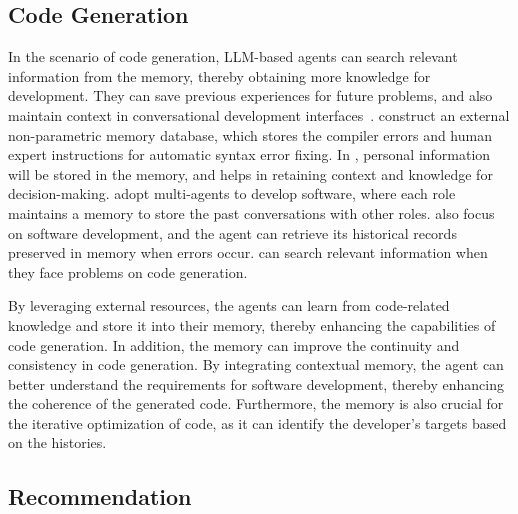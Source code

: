 \documentclass{article}
\theoremstyle{definition}
\theoremstyle{theorem}
\theoremstyle{proof}
\theoremstyle{remark}
\begin{document}
	\subsection{Code Generation}
	In the scenario of code generation, LLM-based agents can search relevant information from the memory, thereby obtaining more knowledge for development. They can save previous experiences for future problems, and also maintain context in conversational development interfaces~\cite{rtlfixer,gamegpt,chatdev,metaagents}.
	\citet{rtlfixer} construct an external non-parametric memory database, which stores the compiler errors and human expert instructions for automatic syntax error fixing. In \cite{gamegpt}, personal information will be stored in the memory, and helps in retaining context and knowledge for decision-making. \citet{chatdev} adopt multi-agents to develop software, where each role maintains a memory to store the past conversations with other roles. \citet{metaagents} also focus on software development, and the agent can retrieve its historical records preserved in memory when errors occur. \citet{codeagent} can search relevant information when they face problems on code generation. 
	
	By leveraging external resources, the agents can learn from code-related knowledge and store it into their memory, thereby enhancing the capabilities of code generation. In addition, the memory can improve the continuity and consistency in code generation. By integrating contextual memory, the agent can better understand the requirements for software development, thereby enhancing the coherence of the generated code. Furthermore, the memory is also crucial for the iterative optimization of code, as it can identify the developer's targets based on the histories.
	
	\subsection{Recommendation}
	
\end{document}
